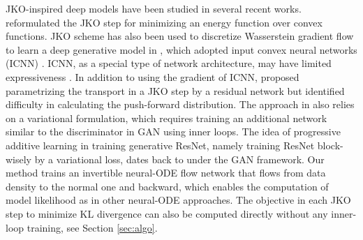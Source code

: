 \documentclass{article}
\theoremstyle{remark}
\theoremstyle{plain}
\begin{document}
% 
JKO-inspired deep models have been studied in several recent works. 
% 
\citep{bunne2022proximal} reformulated the JKO step 
for minimizing an energy function over convex functions. 
% 
JKO scheme has also been used to discretize Wasserstein gradient flow to learn a deep generative model in \citep{alvarez-melis2022optimizing,mokrov2021large},
which adopted input convex neural networks (ICNN) \citep{amos2017input}.
ICNN, as a special type of network architecture,
may have limited expressiveness \citep{rout2022generative,korotin2021wasserstein}.
In addition to using the gradient of ICNN, 
\citep{fan2022variational} proposed parametrizing the transport in a JKO step by a residual network but identified difficulty in calculating the push-forward distribution. 
The approach in \citep{fan2022variational} also relies on a variational formulation, which requires training an additional network similar to the discriminator in GAN using inner loops. 
{The idea of progressive additive learning in training generative ResNet, namely training ResNet block-wisely by a variational loss, dates back to \cite{johnson2019framework} under the GAN framework.}
%
Our method trains an invertible neural-ODE flow network that flows from data density to the normal one and backward, which enables the computation of model likelihood as in other neural-ODE approaches.
%
The objective in each JKO step to minimize KL divergence can also be computed directly without any inner-loop training, see Section \ref{sec:algo}. 
\end{document}
